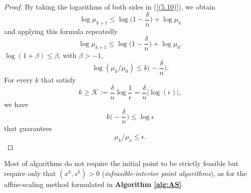 \documentclass[a4paper,10 pt,titlepage,twoside]{book}
\theoremstyle{plain}
\theoremstyle{definition}
\theoremstyle{remark}
\begin{document}
\begin{proof}
	By taking the logarithms of both sides in (\ref{(5.10)}), we obtain
	\begin{equation*}
	\log\mu_{k+1}\leq \log \bigg(1-\frac{\delta}{n}\bigg)+\log\mu_{k}\end{equation*}
	and applying this formula repeatedly
	\begin{equation*}
	\log\mu_{k+1}\leq \log \bigg(1-\frac{\delta}{n}\bigg)+\log\mu_{0}.
	\end{equation*}
	 $\log(1+\beta)\leq\beta$, with $\beta>-1$,\\
	\begin{equation*}
	\log(\mu_{k}/\mu_{0})\leq k\bigg(-\frac{\delta}{n}\bigg).
	\end{equation*}	
	For every $k$ that satisfy
	\begin{equation*}
	k\geq\mathcal{K}:= \frac{\delta}{n}\log\frac{1}{\epsilon} = \frac{\delta}{n}|\log(\epsilon)|,
	\end{equation*}
	we have 
	\begin{equation*}
	k\bigg(-\frac{\delta}{n}\bigg)\leq\log\epsilon
	\end{equation*}	
	that guarantees
	\begin{equation*}
	\mu_{k}/\mu_{o}\leq\epsilon.
	\end{equation*}	
\end{proof}
Most of algorithms do not require the initial point to be strictly feasible but require only that $(x^{k},s^{k})>0$ (\textit{infeasible-interior point algorithms}), as for the affine-scaling method formulated in \textbf{Algorithm \ref{alg:AS}}.\\
\end{document}
